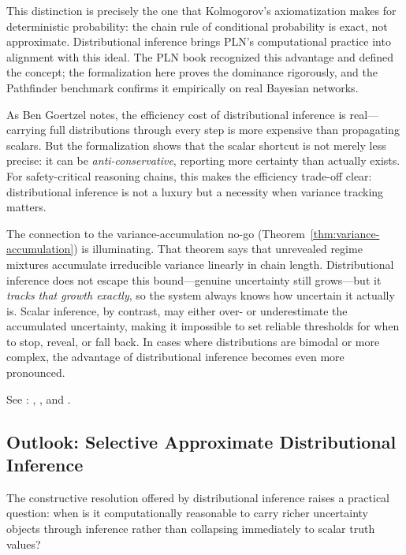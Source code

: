 \documentclass[11pt,openany]{report}
\begin{document}
This distinction is precisely the one that Kolmogorov's axiomatization
makes for deterministic probability: the chain rule of conditional
probability is exact, not approximate.  Distributional inference
brings PLN's computational practice into alignment with this ideal.
The PLN book recognized this advantage and defined the concept; the
formalization here proves the dominance rigorously, and the Pathfinder
benchmark confirms it empirically on real Bayesian networks.

As Ben Goertzel notes, the efficiency cost of distributional inference
is real---carrying full distributions through every step is more expensive
than propagating scalars.  But the formalization shows that the scalar
shortcut is not merely less precise: it can be \emph{anti-conservative},
reporting more certainty than actually exists.  For safety-critical
reasoning chains, this makes the efficiency trade-off clear: distributional
inference is not a luxury but a necessity when variance tracking matters.

\medskip

The connection to the variance-accumulation no-go
(Theorem~\ref{thm:variance-accumulation}) is illuminating.  That theorem
says that unrevealed regime mixtures accumulate irreducible variance
linearly in chain length.  Distributional inference does not escape this
bound---genuine uncertainty still grows---but it \emph{tracks that growth
exactly}, so the system always knows how uncertain it actually is.  Scalar
inference, by contrast, may either over- or underestimate the accumulated
uncertainty, making it impossible to set reliable thresholds for when to
stop, reveal, or fall back.  In cases where distributions are bimodal or
more complex, the advantage of distributional inference becomes even
more pronounced.

\medskip

See : ,
, and .

\subsection*{Outlook: Selective Approximate Distributional Inference}
\label{sec:distributional-outlook}

The constructive resolution offered by distributional inference raises a
practical question: when is it computationally reasonable to carry richer
uncertainty objects through inference rather than collapsing immediately to
scalar truth values?
\end{document}

